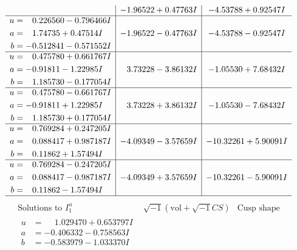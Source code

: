 \documentclass[1p]{elsarticle_modified}
\theoremstyle{definition}
\newcommand{\I}{\sqrt{-1}}
\begin{document}
$$\begin{array}{c|c|c}
 & -1.96522 + 0.47763 I & -4.53788 + 0.92547 I \\ \hline\begin{aligned}
u &= \phantom{-}0.226560 - 0.796466 I \\
a &= \phantom{-}1.74735 + 0.47514 I \\
b &= -0.512841 - 0.571552 I\end{aligned}
 & -1.96522 - 0.47763 I & -4.53788 - 0.92547 I \\ \hline\begin{aligned}
u &= \phantom{-}0.475780 + 0.661767 I \\
a &= -0.91811 - 1.22985 I \\
b &= \phantom{-}1.185730 - 0.177054 I\end{aligned}
 & \phantom{-}3.73228 - 3.86132 I & -1.05530 + 7.68432 I \\ \hline\begin{aligned}
u &= \phantom{-}0.475780 - 0.661767 I \\
a &= -0.91811 + 1.22985 I \\
b &= \phantom{-}1.185730 + 0.177054 I\end{aligned}
 & \phantom{-}3.73228 + 3.86132 I & -1.05530 - 7.68432 I \\ \hline\begin{aligned}
u &= \phantom{-}0.769284 + 0.247205 I \\
a &= \phantom{-}0.088417 + 0.987187 I \\
b &= \phantom{-}0.11862 + 1.57494 I\end{aligned}
 & -4.09349 - 3.57659 I & -10.32261 + 5.90091 I \\ \hline\begin{aligned}
u &= \phantom{-}0.769284 - 0.247205 I \\
a &= \phantom{-}0.088417 - 0.987187 I \\
b &= \phantom{-}0.11862 - 1.57494 I\end{aligned}
 & -4.09349 + 3.57659 I & -10.32261 - 5.90091 I\\
 \hline 
 \end{array}$$\newpage$$\begin{array}{c|c|c}  
\text{Solutions to }I^u_{1}& \I (\text{vol} + \sqrt{-1}CS) & \text{Cusp shape}\\
 \hline 
\begin{aligned}
u &= \phantom{-}1.029470 + 0.653797 I \\
a &= -0.406332 - 0.758563 I \\
b &= -0.583979 - 1.033370 I\end{aligned}

\end{array}$$
\end{document}

